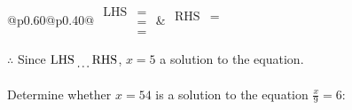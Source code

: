 \documentclass[12pt]{article}
\newcounter{minipagecount}
\begin{document}
\begin{multicols}{2}
\begin{minipage}[t]{0.40\textwidth}
    \noindent
    \renewcommand{\arraystretch}{1.3} %
    \begin{tabular}{@{}p{0.60\linewidth}@{}p{0.40\linewidth}@{}}
        \(\begin{aligned}
            \text{LHS} &=  \\
                    &=  \\
                    &= 
        \end{aligned}\) &
        \(\begin{aligned}
            \text{RHS} &= \\
                    & \\
                    &
        \end{aligned}\)
    \end{tabular}
    \renewcommand{\arraystretch}{1.0} %
    \vspace{2pt}  %

    \noindent \(\therefore\) Since \(\text{LHS} \dotuline{\hspace{5mm}} \text{RHS}\), \(x = 5\) \dotuline{\hspace{12mm}} a solution to the equation.

\end{minipage}

\vspace*{0.5ex}
\vfill{}
\noindent{(\theminipagecount)}\hspace{0.1mm} %
\begin{minipage}[t]{0.40\textwidth} %

    \noindent Determine whether \(x = 54\) is a solution to the equation \(\frac{x}{9} = 6\):
    \vspace{2pt}  %


\end{minipage}
\end{multicols}
\end{document}
